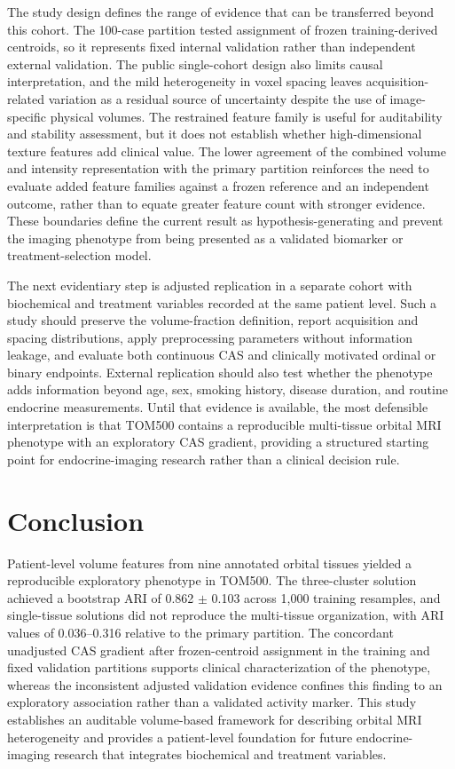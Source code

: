 \documentclass[utf8]{FrontiersinVancouver}
\newcommand{\TOM}{TOM500}
\begin{document}
The study design defines the range of evidence that can be transferred beyond this cohort. The 100-case partition tested assignment of frozen training-derived centroids, so it represents fixed internal validation rather than independent external validation. The public single-cohort design also limits causal interpretation, and the mild heterogeneity in voxel spacing leaves acquisition-related variation as a residual source of uncertainty despite the use of image-specific physical volumes. The restrained feature family is useful for auditability and stability assessment, but it does not establish whether high-dimensional texture features add clinical value. The lower agreement of the combined volume and intensity representation with the primary partition reinforces the need to evaluate added feature families against a frozen reference and an independent outcome, rather than to equate greater feature count with stronger evidence. These boundaries define the current result as hypothesis-generating and prevent the imaging phenotype from being presented as a validated biomarker or treatment-selection model.

The next evidentiary step is adjusted replication in a separate cohort with biochemical and treatment variables recorded at the same patient level. Such a study should preserve the volume-fraction definition, report acquisition and spacing distributions, apply preprocessing parameters without information leakage, and evaluate both continuous CAS and clinically motivated ordinal or binary endpoints. External replication should also test whether the phenotype adds information beyond age, sex, smoking history, disease duration, and routine endocrine measurements. Until that evidence is available, the most defensible interpretation is that TOM500 contains a reproducible multi-tissue orbital MRI phenotype with an exploratory CAS gradient, providing a structured starting point for endocrine-imaging research rather than a clinical decision rule.

\section{Conclusion}
Patient-level volume features from nine annotated orbital tissues yielded a reproducible exploratory phenotype in \TOM{}. The three-cluster solution achieved a bootstrap ARI of 0.862 $\pm$ 0.103 across 1,000 training resamples, and single-tissue solutions did not reproduce the multi-tissue organization, with ARI values of 0.036--0.316 relative to the primary partition. The concordant unadjusted CAS gradient after frozen-centroid assignment in the training and fixed validation partitions supports clinical characterization of the phenotype, whereas the inconsistent adjusted validation evidence confines this finding to an exploratory association rather than a validated activity marker. This study establishes an auditable volume-based framework for describing orbital MRI heterogeneity and provides a patient-level foundation for future endocrine-imaging research that integrates biochemical and treatment variables.
\end{document}
